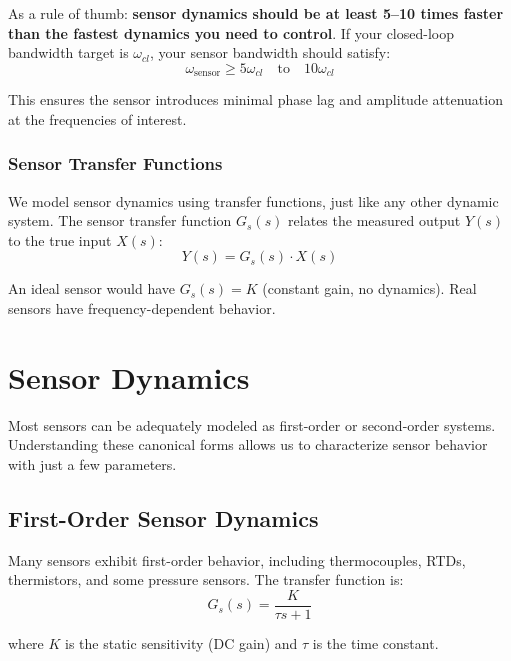 As a rule of thumb: \textbf{sensor dynamics should be at least 5--10 times faster than the fastest dynamics you need to control}. If your closed-loop bandwidth target is $\omega_{cl}$, your sensor bandwidth should satisfy:
\begin{equation}
\omega_{\text{sensor}} \geq 5\omega_{cl} \quad \text{to} \quad 10\omega_{cl}
\label{eq:bandwidth_rule}
\end{equation}

This ensures the sensor introduces minimal phase lag and amplitude attenuation at the frequencies of interest.

\subsubsection{Sensor Transfer Functions}

We model sensor dynamics using transfer functions, just like any other dynamic system. The sensor transfer function $G_s(s)$ relates the measured output $Y(s)$ to the true input $X(s)$:
\begin{equation}
Y(s) = G_s(s) \cdot X(s)
\label{eq:sensor_tf}
\end{equation}

An ideal sensor would have $G_s(s) = K$ (constant gain, no dynamics). Real sensors have frequency-dependent behavior.

\section{Sensor Dynamics}
\label{sec:sensor_dynamics}

Most sensors can be adequately modeled as first-order or second-order systems. Understanding these canonical forms allows us to characterize sensor behavior with just a few parameters.

\subsection{First-Order Sensor Dynamics}

Many sensors exhibit first-order behavior, including thermocouples, RTDs, thermistors, and some pressure sensors. The transfer function is:
\begin{equation}
G_s(s) = \frac{K}{\tau s + 1}
\label{eq:first_order_sensor}
\end{equation}

where $K$ is the static sensitivity (DC gain) and $\tau$ is the time constant.

